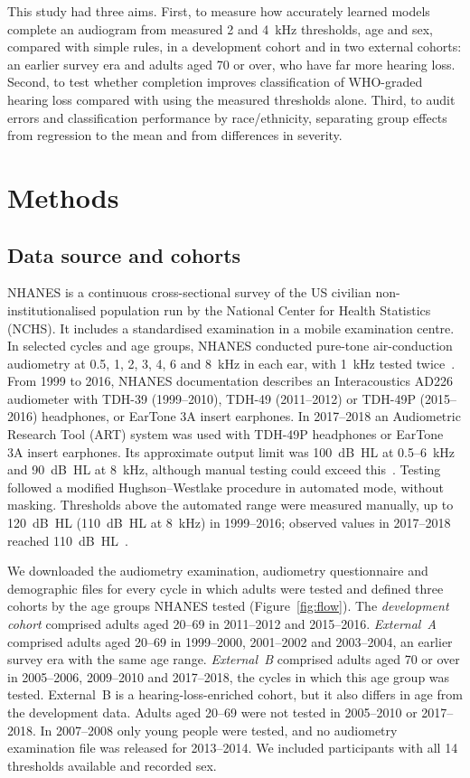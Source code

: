 \documentclass[11pt]{article}
\begin{document}
This study had three aims. First, to measure how accurately learned models complete an audiogram from measured 2 and 4~kHz thresholds, age and sex, compared with simple rules, in a development cohort and in two external cohorts: an earlier survey era and adults aged 70 or over, who have far more hearing loss. Second, to test whether completion improves classification of WHO-graded hearing loss compared with using the measured thresholds alone. Third, to audit errors and classification performance by race/ethnicity, separating group effects from regression to the mean and from differences in severity.

\section*{Methods}

\subsection*{Data source and cohorts}
NHANES is a continuous cross-sectional survey of the US civilian non-institutionalised population run by the National Center for Health Statistics (NCHS). It includes a standardised examination in a mobile examination centre. In selected cycles and age groups, NHANES conducted pure-tone air-conduction audiometry at 0.5, 1, 2, 3, 4, 6 and 8~kHz in each ear, with 1~kHz tested twice~\cite{nhanes_aux_g,nhanes_aux_i}. From 1999 to 2016, NHANES documentation describes an Interacoustics AD226 audiometer with TDH-39 (1999--2010), TDH-49 (2011--2012) or TDH-49P (2015--2016) headphones, or EarTone 3A insert earphones. In 2017--2018 an Audiometric Research Tool (ART) system was used with TDH-49P headphones or EarTone 3A insert earphones. Its approximate output limit was 100~dB~HL at 0.5--6~kHz and 90~dB~HL at 8~kHz, although manual testing could exceed this~\cite{nhanes_aux_j}. Testing followed a modified Hughson--Westlake procedure in automated mode, without masking. Thresholds above the automated range were measured manually, up to 120~dB~HL (110~dB~HL at 8~kHz) in 1999--2016; observed values in 2017--2018 reached 110~dB~HL~\cite{nhanes_aux_g,nhanes_aux_i,nhanes_aux_j}.

We downloaded the audiometry examination, audiometry questionnaire and demographic files for every cycle in which adults were tested and defined three cohorts by the age groups NHANES tested (Figure~\ref{fig:flow}). The \emph{development cohort} comprised adults aged 20--69 in 2011--2012 and 2015--2016. \emph{External~A} comprised adults aged 20--69 in 1999--2000, 2001--2002 and 2003--2004, an earlier survey era with the same age range. \emph{External~B} comprised adults aged 70 or over in 2005--2006, 2009--2010 and 2017--2018, the cycles in which this age group was tested. External~B is a hearing-loss-enriched cohort, but it also differs in age from the development data. Adults aged 20--69 were not tested in 2005--2010 or 2017--2018. In 2007--2008 only young people were tested, and no audiometry examination file was released for 2013--2014. We included participants with all 14 thresholds available and recorded sex.
\end{document}
